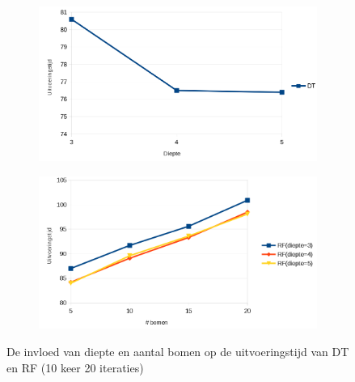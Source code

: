 \begin{figure}[t!]
\centering
\begin{subfigure}{\textwidth}
  \centering
  \includegraphics[width=\linewidth]{images/evaluatie/uitvoeringstijddt.png}
\end{subfigure}
\begin{subfigure}{\textwidth}
  \centering
  \includegraphics[width=\linewidth]{images/evaluatie/uitvoeringstijdrf.png}
\end{subfigure}
\caption{De invloed van diepte en aantal bomen op de uitvoeringstijd van DT en RF (10 keer 20 iteraties)}
\label{fig:invloed diepte en aantal bomen uitvoeringstijd}
\end{figure}
